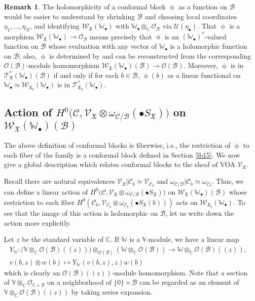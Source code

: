 \documentclass[12pt,a4paper,notitlepage]{article}
\theoremstyle{definition}
\newtheorem{rem}[df]{Remark}
\theoremstyle{plain}
\newcommand{\fk}{\mathfrak}
\newcommand{\mc}{\mathcal}
\newcommand{\scr}{\mathscr}
\newcommand{\SX}{S_{\fk X}}
\newcommand{\blt}{\bullet}
\newcommand{\Vbb}{\mathbb V}
\newcommand{\Wbb}{\mathbb W}
\newcommand{\Cbb}{\mathbb C}
\numberwithin{equation}{section}
\begin{document}
\begin{rem}
The holomorphicity of a conformal block $\upphi$ as a function on $\mc B$ would be easier to understand by shrinking $\mc B$ and choosing local coordinates $\eta_1,\dots,\eta_N$, and identifying $\scr W_{\fk X}(\Wbb_\blt)$  with $\Wbb_\blt\otimes_\Cbb\scr O_{\mc B}$ via $\mc U(\eta_\blt)$. That $\upphi$ is a morphism $\scr W_{\fk X}(\Wbb_\blt)\rightarrow\scr O_{\mc B}$  means precisely that $\upphi$ is an $(\Wbb_\blt)^*$-valued function on $\mc B$ whose evaluation with any vector of $\Wbb_\blt$ is a holomorphic function on $\mc B$; also, $\upphi$ is determined by and can be reconstructed from the corresponding $\scr O(\mc B)$-module homomorphism $\scr W_{\fk X}(\Wbb_\blt)(\mc B)\rightarrow\scr O(\mc B)$. Moreover, $\upphi$ is in $\scr T_{\fk X}^*(\Wbb_\blt)(\mc B)$ if and only if for each $b\in\mc B$, $\upphi(b)$ as a linear functional on $\Wbb_\blt\simeq\scr W_{\fk X_b}(\Wbb_\blt)$ is in $\scr T_{\fk X_b}^*(\Wbb_\blt)$.
\end{rem}





\subsection*{Action of $H^0\big(\mc C,\scr V_{\fk X}\otimes\omega_{\mc C/\mc B}(\blt\SX)\big)$  on $\scr W_{\fk X}(\Wbb_\blt)(\mc B)$}

The above definition of conformal blocks is fiberwise, i.e., the restriction of $\upphi$ to each fiber of the family is a conformal block defined in Section \ref{lb15}. We now give a global description which relates conformal blocks to the sheaf of VOA $\scr V_{\fk X}$.

Recall there are natural equivalences  $\scr V_{\fk X}|\mc C_b\simeq\scr V_{\mc C_b}$ and $\omega_{\mc C/\mc B}|\mc C_b\simeq\omega_{\mc C_b}$. Thus, we can define a linear action of $H^0\big(\mc C,\scr V_{\fk X}\otimes\omega_{\mc C/\mc B}(\blt\SX)\big)$  on $\scr W_{\fk X}(\Wbb_\blt)(\mc B)$ whose restriction to each fiber $H^0(\mc C_b,\scr V_{\mc C_b}\otimes\omega_{\mc C_b}(\blt\SX(b)))$ acts on $\scr W_{\fk X_b}(\Wbb_\blt)$. To see that the image of this action is holomorphic on $\mc B$, let us write down the action more explicitly.




Let $z$ be the standard variable of $\Cbb$. If $\Wbb$ is a $\Vbb$-module, we have a linear map \index{Y@$Y,Y_\Wbb$}
\begin{gather}
Y_\Wbb:\big(\Vbb\otimes_\Cbb\scr O(\mc B)((z))\big)\otimes_{\scr O(\mc B)} (\Wbb\otimes_\Cbb\scr O(\mc B))\rightarrow \Wbb\otimes_\Cbb\scr O(\mc B)((z)),\nonumber\\
v(b,z)\otimes w(b)\mapsto Y_\Wbb(v(b,z),z)w(b)
\end{gather}
which is clearly an $\scr O(\mc B)((z))$-module homomorphism. Note that a section of $\Vbb\otimes_\Cbb\scr O_{\Cbb\times\mc B}$ on a neighborhood of $\{0\}\times \mc B$ can be regarded as an element of $\Vbb\otimes_\Cbb\scr O(\mc B)((z))$ by taking series expansion.
\end{document}
